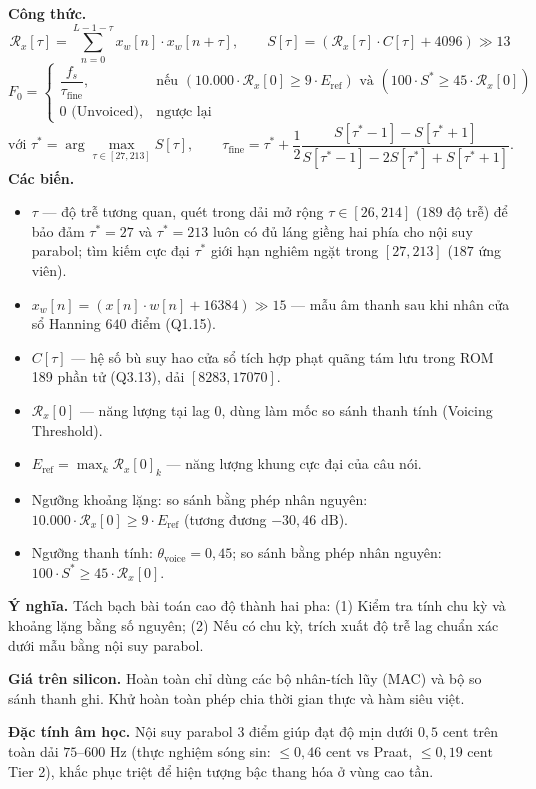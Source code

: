 \documentclass[11pt,a4paper]{article}
\begin{document}
\begin{equationcard}
\textbf{Công thức.}
\[
\mathcal{R}_x[\tau] = \sum_{n=0}^{L - 1 - \tau} x_w[n] \cdot x_w[n+\tau], \qquad S[\tau] = (\mathcal{R}_x[\tau] \cdot C[\tau] + 4096) \gg 13
\]
\[
F_0 = \begin{cases} 
\dfrac{f_s}{\tau_{\text{fine}}}, & \text{nếu } (10.000 \cdot \mathcal{R}_x[0] \ge 9 \cdot E_{\text{ref}}) \text{ và } (100 \cdot S^* \ge 45 \cdot \mathcal{R}_x[0]) \\[3mm] 
0\text{ (Unvoiced)}, & \text{ngược lại} 
\end{cases}
\]
\vspace{-2mm}
\[
\text{với } \tau^* = \arg\max_{\tau \in [27, 213]} S[\tau], \qquad \tau_{\text{fine}} = \tau^* + \frac{1}{2} \frac{S[\tau^*-1] - S[\tau^*+1]}{S[\tau^*-1] - 2S[\tau^*] + S[\tau^*+1]}.
\]
\textbf{Các biến.}
\begin{itemize}\setlength{\itemsep}{0.5pt}
    \item $\tau$ --- độ trễ tương quan, quét trong dải mở rộng $\tau \in [26, 214]$ ($189$ độ trễ) để bảo đảm $\tau^* = 27$ và $\tau^* = 213$ luôn có đủ láng giềng hai phía cho nội suy parabol; tìm kiếm cực đại $\tau^*$ giới hạn nghiêm ngặt trong $[27, 213]$ ($187$ ứng viên).
    \item $x_w[n] = (x[n] \cdot w[n] + 16384) \gg 15$ --- mẫu âm thanh sau khi nhân cửa sổ Hanning $640$ điểm (Q1.15).
    \item $C[\tau]$ --- hệ số bù suy hao cửa sổ tích hợp phạt quãng tám lưu trong ROM 189 phần tử (Q3.13), dải $[8283, 17070]$.
    \item $\mathcal{R}_x[0]$ --- năng lượng tại lag 0, dùng làm mốc so sánh thanh tính (Voicing Threshold).
    \item $E_{\text{ref}} = \max_k \mathcal{R}_x[0]_k$ --- năng lượng khung cực đại của câu nói.
    \item Ngưỡng khoảng lặng: so sánh bằng phép nhân nguyên: $10.000 \cdot \mathcal{R}_x[0] \ge 9 \cdot E_{\text{ref}}$ (tương đương $-30{,}46\text{ dB}$).
    \item Ngưỡng thanh tính: $\theta_{\text{voice}} = 0{,}45$; so sánh bằng phép nhân nguyên: $100 \cdot S^* \ge 45 \cdot \mathcal{R}_x[0]$.
\end{itemize}
\textbf{Ý nghĩa.} Tách bạch bài toán cao độ thành hai pha: (1) Kiểm tra tính chu kỳ và khoảng lặng bằng số nguyên; (2) Nếu có chu kỳ, trích xuất độ trễ lag chuẩn xác dưới mẫu bằng nội suy parabol.

\textbf{Giá trên silicon.} Hoàn toàn chỉ dùng các bộ nhân-tích lũy (MAC) và bộ so sánh thanh ghi. Khử hoàn toàn phép chia thời gian thực và hàm siêu việt.

\textbf{Đặc tính âm học.} Nội suy parabol 3 điểm giúp đạt độ mịn dưới $0{,}5\text{ cent}$ trên toàn dải $75\text{--}600\text{ Hz}$ (thực nghiệm sóng sin: $\le 0{,}46\text{ cent}$ vs Praat, $\le 0{,}19\text{ cent}$ Tier 2), khắc phục triệt để hiện tượng bậc thang hóa ở vùng cao tần.
\end{equationcard}
\end{document}
